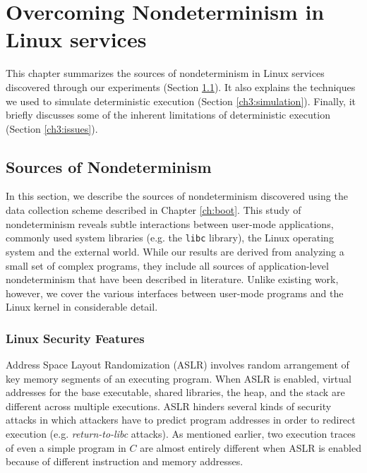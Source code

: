 \newenvironment{mylisting}
{\begin{list}{}{\setlength{\leftmargin}{1em}}\item\scriptsize\bfseries}
{\end{list}}

\chapter{Overcoming Nondeterminism in Linux services} \label{ch:src}
This chapter summarizes the sources of nondeterminism
in Linux services discovered through our experiments (Section \ref{ch3:sources}).
It also explains the techniques we used to simulate 
deterministic execution (Section \ref{ch3:simulation}). 
Finally, it briefly discusses some of the inherent
limitations of deterministic execution (Section \ref{ch3:issues}).

\section{Sources of Nondeterminism} \label{ch3:sources}
In this section, we describe the sources of nondeterminism
discovered using the data collection scheme
described in Chapter \ref{ch:boot}.
This study of nondeterminism reveals
subtle interactions between user-mode
applications, commonly used system libraries (e.g. the \texttt{libc} library),
the Linux operating system and the external world.
While our results are derived from analyzing a small
set of complex programs, they include
all sources of application-level nondeterminism that 
have been described in literature. Unlike existing work,
however, we cover the various interfaces between user-mode programs
and the Linux kernel in considerable detail.

\subsection{Linux Security Features} \label{ch3:security}
 \newline
Address Space Layout Randomization (ASLR) involves random arrangement of
key memory segments of an executing program. When ASLR is enabled,
virtual addresses for the base executable, shared libraries, 
the heap, and the stack are different across multiple executions.
ASLR hinders several kinds of security attacks in which attackers have to predict
program addresses in order to redirect execution (e.g. \emph{return-to-libc} attacks). 
As mentioned earlier, two execution traces of even a
simple program in $C$ are almost entirely different
when ASLR is enabled because of different
instruction and memory addresses. \newline

